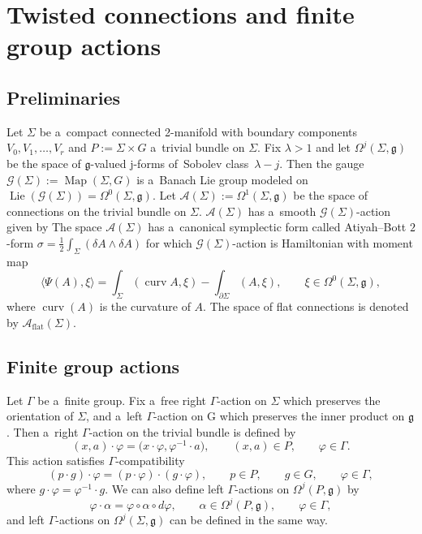 \documentclass[pdftex]{sigma}
\numberwithin{equation}{section}
\theoremstyle{definition}
\newcommand{\Map}{\operatorname{Map}}
\newcommand{\Lie}{\operatorname{Lie}}
\newcommand{\curv}{\operatorname{curv}}
\begin{document}
\section{Twisted connections and finite group actions}\label{5Tw_conn_and_fin_grp_act}

\subsection{Preliminaries}
Let $\Sigma$ be a~compact connected 2-manifold with boundary components $V_0, V_1, \dots, V_{r}$ and $P := \Sigma \times G$ a~trivial bundle on $\Sigma$.
Fix $\lambda > 1$ and let $\Omega^{j}(\Sigma,\mathfrak{g})$ be the space of $\mathfrak{g}$-valued j-forms of~Sobolev class~${\lambda-j}$.
Then the gauge $\mathcal{G}(\Sigma) := \Map(\Sigma,G)$ is a~Banach Lie group modeled on $\Lie(\mathcal{G}(\Sigma)) = \Omega^{0}(\Sigma,\mathfrak{g})$.
Let $\mathcal{A}(\Sigma) := \Omega^{1}(\Sigma,\mathfrak{g})$ be the space of connections on the trivial bundle on $\Sigma$.
$\mathcal{A}(\Sigma)$ has a~smooth $\mathcal{G}(\Sigma)$-action given by
The space $\mathcal{A}(\Sigma)$ has a~canonical symplectic form called Atiyah--Bott $2$-form
$\sigma = \frac{1}{2} \int_{\Sigma} (\delta A\wedge \delta A )$
for which $\mathcal{G}(\Sigma)$-action is Hamiltonian with moment map
\[\langle \Psi(A), \xi\rangle = \int_{\Sigma} (\curv A,\xi) - \int _{\partial \Sigma} (A,\xi), \qquad \xi \in \Omega^{0}(\Sigma,\mathfrak{g}),
\]
where $\curv(A) $ is the curvature of $A$.
The space of flat connections is denoted by $\mathcal{A}_{\mathrm{flat}}(\Sigma)$.

\subsection{Finite group actions}
Let $\Gamma$ be a~finite group.
Fix a~free right $\Gamma$-action on $\Sigma$ which preserves the orientation of $\Sigma$, and a~left $\Gamma$-action on G which preserves the inner product on $\mathfrak{g}$.
Then a~right $\Gamma$-action on the trivial bundle is defined by
\[(x,a) \cdot \varphi = \bigl(x\cdot \varphi, \varphi ^{-1} \cdot a\bigr) ,\qquad (x,a) \in P,\qquad \varphi \in \Gamma.\]
This action satisfies $\Gamma$-compatibility
\[ (p\cdot g)\cdot \varphi = (p \cdot \varphi)\cdot (g \cdot \varphi), \qquad p \in P,\qquad g \in G,\qquad \varphi \in \Gamma,
\]
where $g\cdot \varphi = \varphi^{-1} \cdot g$.
We can also define left $\Gamma$-actions on $\Omega^{j}(P,\mathfrak{g})$ by
\[
\varphi \cdot \alpha = \varphi \circ \alpha \circ d\varphi , \qquad \alpha \in \Omega^{j}(P,\mathfrak{g}),\qquad \varphi \in \Gamma,
\]
and left $\Gamma$-actions on $\Omega^{j}(\Sigma,\mathfrak{g})$ can be defined in the same way.
\end{document}
